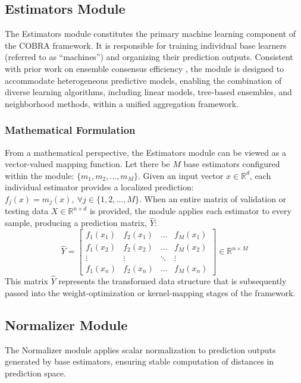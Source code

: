 \subsection{Estimators Module}
\label{subsec:estimators_module}

\hs The Estimators module constitutes the primary machine learning component of the COBRA framework. It is responsible for training individual base learners (referred to as ``machines'') and organizing their prediction outputs. Consistent with prior work on ensemble consensus efficiency \cite{ali2015, cagnini2023}, the module is designed to accommodate heterogeneous predictive models, enabling the combination of diverse learning algorithms, including linear models, tree-based ensembles, and neighborhood methods, within a unified aggregation framework.


\subsubsection*{Mathematical Formulation}
From a mathematical perspective, the Estimators module can be viewed as a vector-valued mapping function. Let there be $M$ base estimators configured within the module: $\{m_1, m_2, \dots, m_M\}$. Given an input vector $x \in \mathbb{R}^d$, each individual estimator provides a localized prediction: $f_j(x) = m_j(x), \ \forall j \in \{1, 2, \dots, M\}$. When an entire matrix of validation or testing data $X \in \mathbb{R}^{n \times d}$ is provided, the module applies each estimator to every sample, producing a prediction matrix, $\hat{Y}$:
\[
    \hat{Y} = \begin{bmatrix}
        f_1(x_1) & f_2(x_1) & \dots  & f_M(x_1) \\
        f_1(x_2) & f_2(x_2) & \dots  & f_M(x_2) \\
        \vdots   & \vdots   & \ddots & \vdots   \\
        f_1(x_n) & f_2(x_n) & \dots  & f_M(x_n)
    \end{bmatrix} \in \mathbb{R}^{n \times M}
\]
This matrix $\hat{Y}$ represents the transformed data structure that is subsequently passed into the weight-optimization or kernel-mapping stages of the framework.

\subsection{Normalizer Module}
\label{subsec:normalizer_module}

\hs The Normalizer module applies scalar normalization to prediction outputs generated by base estimators, ensuring stable computation of distances in prediction space.

